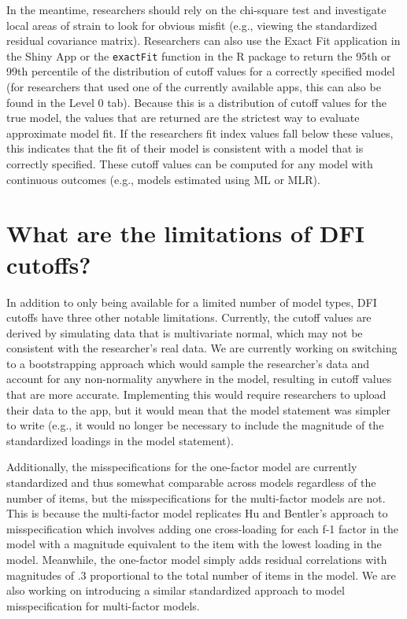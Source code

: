 \documentclass[
]{book}
\begin{document}
In the meantime, researchers should rely on the chi-square test and investigate local areas of strain to look for obvious misfit (e.g., viewing the standardized residual covariance matrix). Researchers can also use the Exact Fit application in the Shiny App or the \texttt{exactFit} function in the R package to return the 95th or 99th percentile of the distribution of cutoff values for a correctly specified model (for researchers that used one of the currently available apps, this can also be found in the Level 0 tab). Because this is a distribution of cutoff values for the true model, the values that are returned are the strictest way to evaluate approximate model fit. If the researchers fit index values fall below these values, this indicates that the fit of their model is consistent with a model that is correctly specified. These cutoff values can be computed for any model with continuous outcomes (e.g., models estimated using ML or MLR).

\hypertarget{limitations}{%
\chapter{What are the limitations of DFI cutoffs?}\label{limitations}}

In addition to only being available for a limited number of model types, DFI cutoffs have three other notable limitations. Currently, the cutoff values are derived by simulating data that is multivariate normal, which may not be consistent with the researcher's real data. We are currently working on switching to a bootstrapping approach which would sample the researcher's data and account for any non-normality anywhere in the model, resulting in cutoff values that are more accurate. Implementing this would require researchers to upload their data to the app, but it would mean that the model statement was simpler to write (e.g., it would no longer be necessary to include the magnitude of the standardized loadings in the model statement).

Additionally, the misspecifications for the one-factor model are currently standardized and thus somewhat comparable across models regardless of the number of items, but the misspecifications for the multi-factor models are not. This is because the multi-factor model replicates Hu and Bentler's approach to misspecification which involves adding one cross-loading for each f-1 factor in the model with a magnitude equivalent to the item with the lowest loading in the model. Meanwhile, the one-factor model simply adds residual correlations with magnitudes of .3 proportional to the total number of items in the model. We are also working on introducing a similar standardized approach to model misspecification for multi-factor models.
\end{document}
